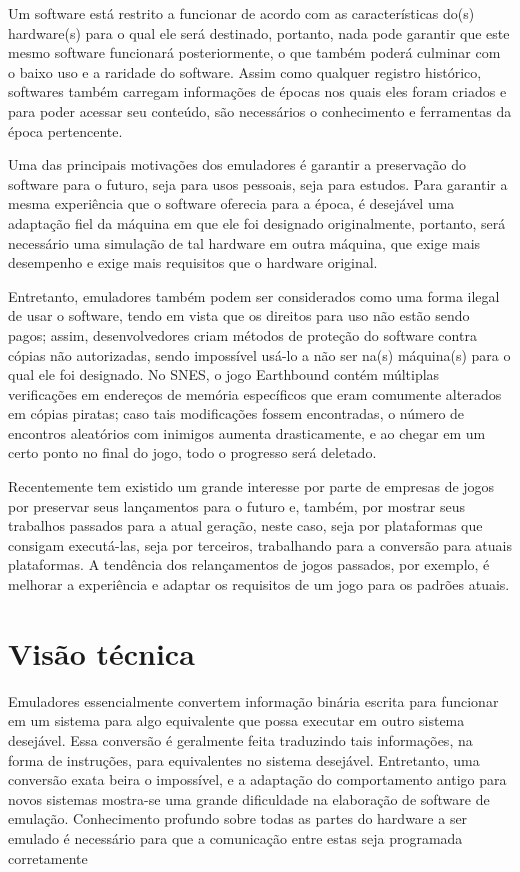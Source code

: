 \documentclass[12pt]{article}
\begin{document}
Um software está restrito a funcionar de acordo com as características do(s)
hardware(s) para o  qual ele será destinado, portanto, nada pode garantir que
este mesmo software funcionará posteriormente, o que também poderá culminar com
o baixo uso e a raridade do software. Assim como qualquer registro histórico,
softwares também carregam informações de épocas nos quais eles foram criados e
para poder acessar seu conteúdo, são necessários o conhecimento e ferramentas da
época pertencente.

Uma das principais motivações dos emuladores é garantir a preservação do
software para o futuro, seja para usos pessoais, seja para estudos. Para
garantir a mesma experiência que o software oferecia para a época, é desejável
uma adaptação fiel da máquina em que ele foi designado originalmente, portanto,
será necessário uma simulação de tal hardware em outra máquina, que exige mais
desempenho e exige mais requisitos que o hardware original.

Entretanto, emuladores também podem ser considerados como uma forma ilegal de
usar o software, tendo em vista que os direitos para uso não estão sendo pagos;
assim, desenvolvedores criam métodos de proteção do software contra cópias não
autorizadas, sendo impossível usá-lo a não ser na(s) máquina(s) para o qual ele
foi designado. No SNES, o jogo Earthbound contém múltiplas verificações em
endereços de memória específicos que eram comumente alterados em cópias piratas;
caso tais modificações fossem encontradas, o número de encontros aleatórios com
inimigos aumenta drasticamente, e ao chegar em um certo ponto no final do jogo,
todo o progresso será deletado.

Recentemente tem existido um grande interesse por parte de empresas de jogos por
preservar seus lançamentos para o futuro e, também, por mostrar seus trabalhos
passados para a atual geração, neste caso, seja por plataformas que consigam
executá-las, seja por terceiros, trabalhando para a conversão para atuais
plataformas. A tendência dos relançamentos de jogos passados, por exemplo, é
melhorar a experiência e adaptar os requisitos de um jogo para os padrões
atuais.

\section{Visão técnica}

Emuladores essencialmente convertem informação binária escrita para funcionar em
um sistema para algo equivalente que possa executar em outro sistema desejável.
Essa conversão é geralmente feita traduzindo tais informações, na forma de
instruções, para equivalentes no sistema desejável. Entretanto, uma conversão
exata beira o impossível, e a adaptação do comportamento antigo para novos
sistemas mostra-se uma grande dificuldade na elaboração de software de emulação.
Conhecimento profundo sobre todas as partes do hardware a ser emulado é
necessário para que a comunicação entre estas seja programada corretamente
\end{document}
